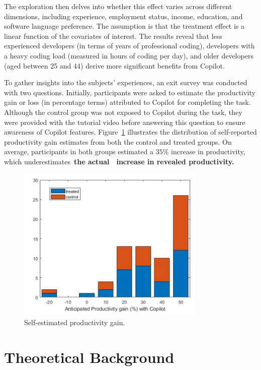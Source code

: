 \documentclass[12pt]{extarticle}
\begin{document}
The exploration then delves into whether this effect varies across different dimensions, including experience, employment status, income, education, and software language preference. The assumption is that the treatment effect is a linear function of the covariates of interest. The results reveal that less experienced developers (in terms of years of professional coding), developers with a heavy coding load (measured in hours of coding per day), and older developers (aged between 25 and 44) derive more significant benefits from Copilot.

To gather insights into the subjects' experiences, an exit survey was conducted with two questions. Initially, participants were asked to estimate the productivity gain or loss (in percentage terms) attributed to Copilot for completing the task. Although the control group was not exposed to Copilot during the task, they were provided with the tutorial video before answering this question to ensure awareness of Copilot features. Figure~\ref{fig:productivity_gain} illustrates the distribution of self-reported productivity gain estimates from both the control and treated groups. On average, participants in both groups estimated a $35 \%$ increase in productivity, which underestimates~\textbf{the actual}~~\textbf{increase in revealed productivity.}

\begin{figure}[ht]
    \centering
    \includegraphics[width=0.8\textwidth]{img/productivity_gain.png}
    \caption{Self-estimated productivity gain.}\label{fig:productivity_gain}
\end{figure}

\section{Theoretical Background}
\end{document}
